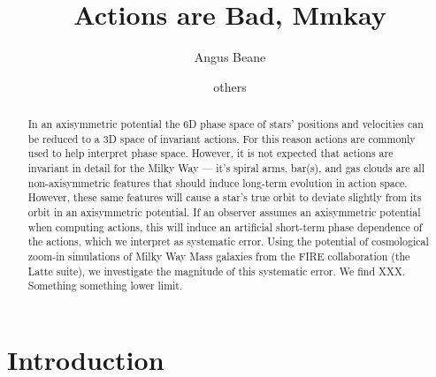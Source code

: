 \documentclass[twocolumn]{aastex62}
\begin{document}
\title{Actions are Bad, Mmkay}


\author{Angus Beane}

\author{others}

\begin{abstract}

In an axisymmetric potential the 6D phase space of stars' positions and velocities can be reduced to a 3D space of invariant actions. For this reason actions are commonly used to help interpret phase space. However, it is not expected that actions are invariant in detail for the Milky Way --- it's spiral arms, bar(s), and gas clouds are all non-axisymmetric features that should induce long-term evolution in action space. However, these same features will cause a star's true orbit to deviate slightly from its orbit in an axisymmetric potential. If an observer assumes an axisymmetric potential when computing actions, this will induce an artificial short-term phase dependence of the actions, which we interpret as systematic error. Using the potential of cosmological zoom-in simulations of Milky Way Mass galaxies from the FIRE collaboration (the Latte suite), we investigate the magnitude of this systematic error. We find XXX. Something something lower limit.

\end{abstract}


\section{Introduction} \label{sec:intro}


% 
\end{document}
